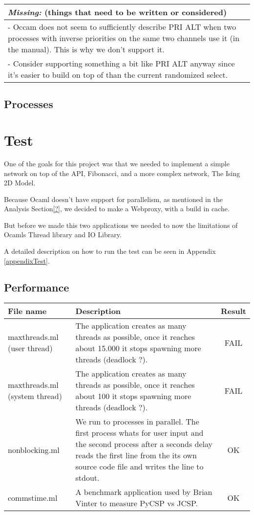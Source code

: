 \documentclass[a4paper,12pt]{article}
\newcommand{\missing}[1]{
  \begin{tabular}{|p{11cm}|}
    \hline
    \emph{Missing:} {\scriptsize (things that need to be written or considered)} \\
    \hline
    #1
    \hline
  \end{tabular}
}
\begin{document}
\missing{
- Occam does not seem to sufficiently describe PRI ALT when two processes with inverse priorities
on the same two channels use it (in the manual). This is why we don't support it. \\
- Consider supporting something a bit like PRI ALT anyway since it's easier to build on top of
than the current randomized select. \\
}

\subsection{Processes}

\section{Test}
\label{test}
One of the goals for this project was that we needed to implement a simple
network on top of the API, Fibonacci, and a more complex network, The Ising 2D
Model.

Because Ocaml doesn't have support for parallelism, as mentioned in the Analysis
Section\ref{?}, we decided to make a Webproxy, with a build in cache.

But before we made this two applications we needed to now the limitations of
Ocamls Thread library and IO Library.

A detailed description on how to run the test can be seen in
Appendix \ref{appendixTest}.

\subsection{Performance}

\begin{tabular}{|p{3cm}|p{8.5cm}|c|}
    \hline
    	File name &
	Description &
	Result \\
    \hline
    	maxthreads.ml (user thread) &
        The application creates as many threads as possible, once it reaches
        about 15.000 it stops spawning more threads (deadlock ?).&
	FAIL \\
    \hline
    	maxthreads.ml (system thread) &
        The application creates as many threads as possible, once it reaches
        about 100 it stops spawning more threads (deadlock ?).&
	FAIL \\
    \hline
    	nonblocking.ml &
        We run to processes in parallel. The first process whats for user input
        and the second process after a seconds delay reads the first line from
        the its own source code file and writes the line to stdout.&
	OK \\
    \hline
    	commstime.ml &
        A benchmark application used by Brian Vinter to measure PyCSP vs JCSP.&
	OK \\
    \hline
  \end{tabular} 
\end{document}
